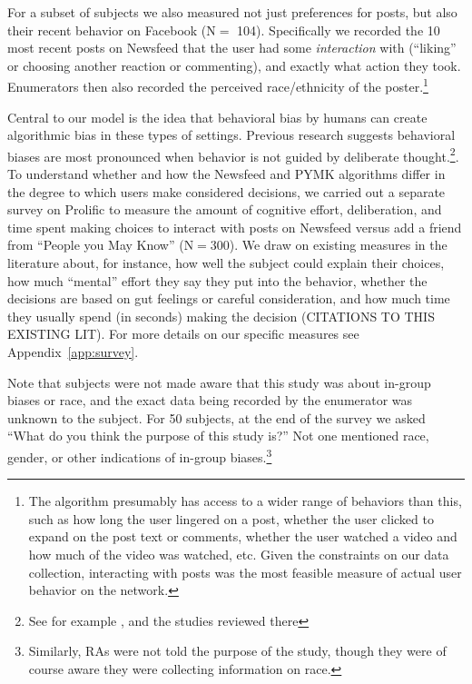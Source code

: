\documentclass[12pt,letterpaper]{article}
\newcommand{\ProlificSampleSize}{300}
\newcommand{\RecentInteractionsSampleSize}{104}
\newcommand{\StudyAboutSampleSize}{50}
\begin{document}
For a subset of subjects we also measured not just preferences for posts, but also their recent behavior on Facebook (N$=$ \RecentInteractionsSampleSize). Specifically we recorded the 10 most recent posts on Newsfeed that the user had some \emph{interaction} with (``liking'' or choosing another reaction or commenting), and exactly what action they took. Enumerators then also recorded the perceived race/ethnicity of the poster.\footnote{The algorithm presumably has access to a wider range of behaviors than this, such as how long the user lingered on a post, whether the user clicked to expand on the post text or comments, whether the user watched a video and how much of the video was watched, etc. Given the constraints on our data collection, interacting with posts was the most feasible measure of actual user behavior on the network.} 

Central to our model is the idea that behavioral bias by humans can create algorithmic bias in these types of settings. Previous research suggests behavioral biases are most pronounced when behavior is not guided by deliberate thought.\footnote{See for example \citet{payne2002best}, \citet{lueke2015mindfulness} and the studies reviewed there}. To understand whether and how the Newsfeed and PYMK algorithms differ in the degree to which users make considered decisions, we carried out a separate survey on Prolific to measure the amount of cognitive effort, deliberation, and time spent making choices to interact with posts on Newsfeed versus add a friend from ``People you May Know'' (N$=$\ProlificSampleSize). We draw on existing measures in the literature about, for instance, how well the subject could explain their choices, how much ``mental'' effort they say they put into the behavior, whether the decisions are based on gut feelings or careful consideration, and how much time they usually spend (in seconds) making the decision (CITATIONS TO THIS EXISTING LIT). For more details on our specific measures see Appendix~\ref{app:survey}.

Note that subjects were not made aware that this study was about in-group biases or race, and the exact data being recorded by the enumerator was unknown to the subject. For \StudyAboutSampleSize{} subjects, at the end of the survey we asked ``What do you think the purpose of this study is?'' Not one mentioned race, gender, or other indications of in-group biases.\footnote{Similarly, RAs were not told the purpose of the study, though they were of course aware they were collecting information on race.}
\end{document}
